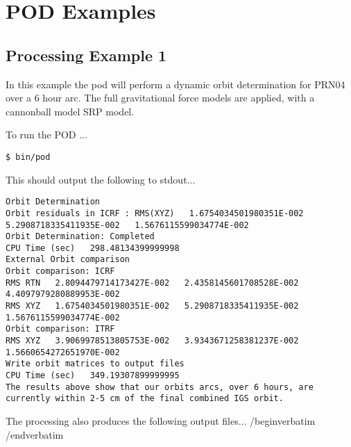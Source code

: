 \chapter{POD Examples}
\label{ch:pod_examples}

\section{Processing Example 1}
In this example the pod will perform a dynamic orbit determination for PRN04 over a 6 hour arc. 
The full gravitational force models are applied, with a cannonball model SRP model.

To run the POD ...
\begin{verbatim}
$ bin/pod
\end{verbatim}

This should output the following to stdout...
\begin{lstlisting}
Orbit Determination
Orbit residuals in ICRF : RMS(XYZ)   1.6754034501980351E-002   5.2908718335411935E-002   1.5676115599034774E-002
Orbit Determination: Completed
CPU Time (sec)   298.48134399999998
External Orbit comparison
Orbit comparison: ICRF
RMS RTN   2.8094479714173427E-002   2.4358145601708528E-002   4.4097979280889953E-002
RMS XYZ   1.6754034501980351E-002   5.2908718335411935E-002   1.5676115599034774E-002
Orbit comparison: ITRF
RMS XYZ   3.9069978513805753E-002   3.9343671258381237E-002   1.5660654272651970E-002
Write orbit matrices to output files
CPU Time (sec)   349.19307899999995
The results above show that our orbits arcs, over 6 hours, are currently within 2-5 cm of the final combined IGS orbit.
\end{lstlisting}

The processing also produces the following output files...
/begin{verbatim}
/end{verbatim}

